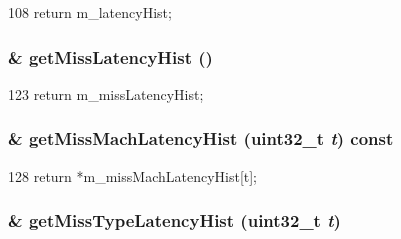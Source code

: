 \begin{DoxyCode}
108 { return m_latencyHist; }
\end{DoxyCode}
\hypertarget{classSequencer_ac9bb113b7a017a3530b476b4a6a86995}{
\subsubsection[{getMissLatencyHist}]{\& getMissLatencyHist ()}}
\label{classSequencer_ac9bb113b7a017a3530b476b4a6a86995}



\begin{DoxyCode}
123     { return m_missLatencyHist; }
\end{DoxyCode}
\hypertarget{classSequencer_a3ebf605b76407a53e0c62c2578cc7248}{
\subsubsection[{getMissMachLatencyHist}]{\& getMissMachLatencyHist ({\bf uint32\_\-t} {\em t}) const}}
\label{classSequencer_a3ebf605b76407a53e0c62c2578cc7248}



\begin{DoxyCode}
128     { return *m_missMachLatencyHist[t]; }
\end{DoxyCode}
\hypertarget{classSequencer_acca7e48b22f04eb014984ab493afe1e0}{
\subsubsection[{getMissTypeLatencyHist}]{\& getMissTypeLatencyHist ({\bf uint32\_\-t} {\em t})}}
\label{classSequencer_acca7e48b22f04eb014984ab493afe1e0}



